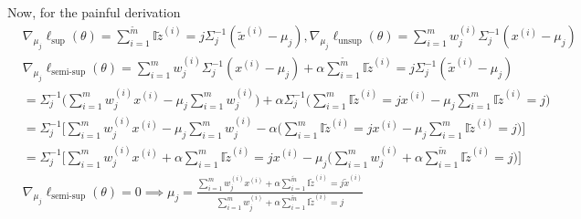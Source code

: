 \documentclass{article}
\begin{document}
Now, for the painful derivation
\begin{align*}
    & \nabla_{\mu_{j}}\ell_{\text{sup}}(\theta)=\sum_{i=1}^{\tilde{m}}\mathbb{I}{\tilde{z}^{(i)}=j}\Sigma_{j}^{-1}(\tilde{x}^{(i)}-\mu_{j}),\nabla_{\mu_{j}}\ell_{\text{unsup}}(\theta)=\sum_{i=1}^{m}w_{j}^{(i)}\Sigma_{j}^{-1}(x^{(i)}-\mu_{j})                                                                                                                                       \\
    & \nabla_{\mu_{j}}\ell_{\text{semi-sup}}(\theta)=\sum_{i=1}^{m}w_{j}^{(i)}\Sigma_{j}^{-1}(x^{(i)}-\mu_{j})+\alpha\sum_{i=1}^{\tilde{m}}\mathbb{I}{\tilde{z}^{(i)}=j}\Sigma_{j}^{-1}(\tilde{x}^{(i)}-\mu_{j})                                                                                                                                                                        \\
    & =\Sigma_{j}^{-1}\Big(\sum_{i=1}^{m}w_{j}^{(i)}x^{(i)}-\mu_{j}\sum_{i=1}^{m}w_{j}^{(i)}\Big)+\alpha\Sigma_{j}^{-1}\Big(\sum_{i=1}^{m}\mathbb{I}{\tilde{z}^{(i)}=j}x^{(i)}-\mu_{j}\sum_{i=1}^{m}\mathbb{I}{\tilde{z}^{(i)}=j}\Big)                                                                                                                                                  \\
    & =\Sigma_{j}^{-1}\Big[\sum_{i=1}^{m}w_{j}^{(i)}x^{(i)}-\mu_{j}\sum_{i=1}^{m}w_{j}^{(i)}-\alpha\Big(\sum_{i=1}^{m}\mathbb{I}{\tilde{z}^{(i)}=j}x^{(i)}-\mu_{j}\sum_{i=1}^{m}\mathbb{I}{\tilde{z}^{(i)}=j}\Big)\Big]                                                                                                                                                                 \\
    & =\Sigma_{j}^{-1}\Big[\sum_{i=1}^{m}w_{j}^{(i)}x^{(i)}+\alpha\sum_{i=1}^{m}\mathbb{I}{\tilde{z}^{(i)}=j}x^{(i)}-\mu_{j}\Big(\sum_{i=1}^{m}w_{j}^{(i)}+\alpha\sum_{i=1}^{\tilde{m}}\mathbb{I}{\tilde{z}^{(i)}=j}\Big)\Big]                                                                                                                                                          \\
    & \nabla_{\mu_{j}}\ell_{\text{semi-sup}}(\theta)=0\implies\mu_{j}=\frac{\sum_{i=1}^{m}w_{j}^{(i)}x^{(i)}+\alpha\sum_{i=1}^{\tilde{m}}\mathbb{I}{\tilde{z}^{(i)}=j}\tilde{x}^{(i)}}{\sum_{i=1}^{m}w_{j}^{(i)}+\alpha\sum_{i=1}^{\tilde{m}}\mathbb{I}{\tilde{z}^{(i)}=j}}                                                                                                             \\

\end{align*}
\end{document}
